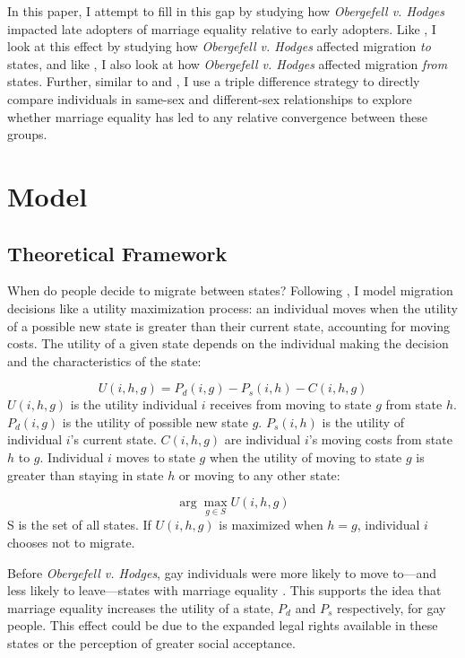 \documentclass[12pt,letterpaper]{article}
\begin{document}
In this paper, I attempt to fill in this gap by studying how \textit{Obergefell v. Hodges} impacted late adopters of marriage equality relative to early adopters. Like \citet{1}, I look at this effect by studying how \textit{Obergefell v. Hodges} affected migration \textit{to} states, and like \citet{12}, I also look at how \textit{Obergefell v. Hodges} affected migration \textit{from} states. Further, similar to \citet{3} and \citet{30}, I use a triple difference strategy to directly compare individuals in same-sex and different-sex relationships to explore whether marriage equality has led to any relative convergence between these groups.



\section{Model}
\subsection{Theoretical Framework}
When do people decide to migrate between states? Following \citet{12}, I model migration decisions like a utility maximization process: an individual moves when the utility of a possible new state is greater than their current state, accounting for moving costs. The utility of a given state depends on the individual making the decision and the characteristics of the state:

\begin{equation}
U(i, h, g) = P_d(i, g) - P_s(i, h) - C(i, h, g)
\end{equation}
$U(i, h, g)$ is the utility individual $i$ receives from moving to state $g$ from state $h$. $P_d(i, g)$ is the utility of possible new state $g$. $P_s(i, h)$ is the utility of individual $i$'s current state. $C(i, h, g)$ are individual $i$'s moving costs from state $h$ to $g$. Individual $i$ moves to state $g$ when the utility of moving to state $g$ is greater than staying in state $h$ or moving to any other state:

\begin{equation}
\arg\max_{g \in S} U(i, h, g)
\end{equation}
S is the set of all states. If $U(i, h, g)$ is maximized when $h = g$, individual $i$ chooses not to migrate.

\hfill
\break
Before \textit{Obergefell v. Hodges}, gay individuals were more likely to move to—and less likely to leave—states with marriage equality \citep{1, 12}. This supports the idea that marriage equality increases the utility of a state, $P_d$  and $P_s$ respectively, for gay people. This effect could be due to the expanded legal rights available in these states or the perception of greater social acceptance.
\end{document}
